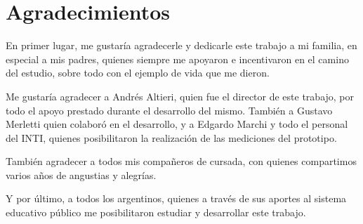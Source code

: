 \chapter*{Agradecimientos}

En primer lugar, me gustaría agradecerle y dedicarle este trabajo a mi familia,
en especial a mis padres, quienes siempre me apoyaron e incentivaron en el
camino del estudio, sobre todo con el ejemplo de vida que me dieron.

Me gustaría agradecer a Andrés Altieri, quien fue el director de este trabajo, por
todo el apoyo prestado durante el desarrollo del mismo. También a Gustavo
Merletti quien colaboró en el desarrollo, y a Edgardo Marchi y todo el personal
del INTI, quienes posibilitaron la realización de las mediciones del prototipo.

También agradecer a todos mis compañeros de cursada, con quienes compartimos
varios años de angustias y alegrías.

Y por último, a todos los argentinos, quienes a través de sus aportes al sistema
educativo público me posibilitaron estudiar y desarrollar este trabajo.
